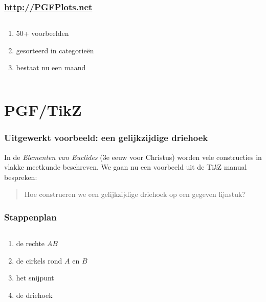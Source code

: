 \documentclass[]{beamer}
\begin{document}
\begin{frame}
  \frametitle{\url{http://PGFPlots.net}}

  \begin{columns}
    \begin{column}{.4\textwidth}
      \begin{enumerate}
        \item 50+ voorbeelden
        \item gesorteerd in categorie\"en
        \item bestaat nu een maand
      \end{enumerate}
    \end{column}

    \begin{column}{.6\textwidth}
      \begin{flushright}
        
      \end{flushright}
    \end{column}
  \end{columns}
\end{frame}

\section{PGF/TikZ}

\begin{frame}
  \frametitle{Uitgewerkt voorbeeld: een gelijkzijdige driehoek}

  In de \emph{Elementen van Euclides} (3e eeuw voor Christus) worden vele constructies in vlakke meetkunde beschreven. We gaan nu een voorbeeld uit de Ti\textit{k}Z manual bespreken:
  \begin{quote}
    Hoe construeren we een gelijkzijdige driehoek op een gegeven lijnstuk?
  \end{quote}

  \pause
  \centering
  
\end{frame}

\begin{frame}
  \frametitle{Stappenplan}

  \begin{columns}
    \begin{column}{.5\textwidth}
      \begin{enumerate}
        \item de rechte $AB$
        \item de cirkels rond $A$ en $B$
        \item het snijpunt
        \item de driehoek
      \end{enumerate}
    \end{column}
    \begin{column}{.5\textwidth}
      \centering
      
    \end{column}
  \end{columns}
\end{frame}
\end{document}
